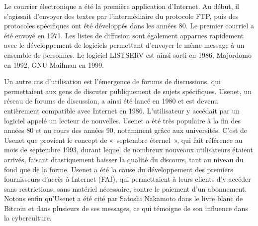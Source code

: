Le courrier électronique a été la première application d'Internet. Au début, il s'agissait d'envoyer des textes par l'intermédiaire du protocole FTP, puis des protocoles spécifiques ont été développés dans les années 80. Le premier courriel a été envoyé en 1971. Les listes de diffusion sont également apparues rapidement avec le développement de logiciels permettant d'envoyer le même message à un ensemble de personnes. Le logiciel LISTSERV est ainsi sorti en 1986, Majordomo en 1992, GNU Mailman en 1999.

Un autre cas d'utilisation est l'émergence de forums de discussions, qui permettaient aux gens de discuter publiquement de sujets spécifiques. Usenet, un réseau de forums de discussion, a ainsi été lancé en 1980 et est devenu entièrement compatible avec Internet en 1986. L'utilisateur y accédait par un logiciel appelé un lecteur de nouvelles. Usenet a été très populaire à la fin des années 80 et au cours des années 90, notamment grâce aux universités. C'est de Usenet que provient le concept de «~septembre éternel~», qui fait référence au mois de septembre 1993, durant lequel de nombreux nouveaux utilisateurs étaient arrivés, faisant drastiquement baisser la qualité du discours, tant au niveau du fond que de la forme. Usenet a été la cause du développement des premiers fournisseurs d'accès à Internet (FAI), qui permettaient à leurs clients d'y accéder sans restrictions, sans matériel nécessaire, contre le paiement d'un abonnement. Notons enfin qu'Usenet a été cité par Satoshi Nakamoto dans le livre blanc de Bitcoin et dans plusieurs de ses messages, ce qui témoigne de son influence dans la cyberculture. %

